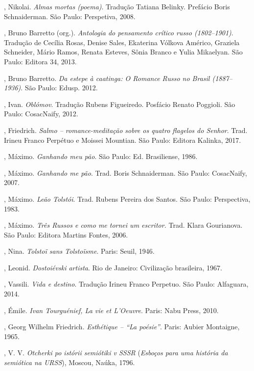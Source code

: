 \begin{Parskip}
, Nikolai. \emph{Almas mortas (poema)}. Tradução Tatiana Belinky. Prefácio Boris Schnaiderman. São Paulo: Perspetiva, 2008.

, Bruno Barretto (org.). \emph{Antologia do pensamento crítico russo (1802--1901)}. Tradução de Cecília Rosas, Denise Sales, Ekaterina Vólkova Américo, Graziela Schneider, Mário Ramos, Renata Esteves, Sônia Branco e Yulia Mikaelyan. São Paulo: Editora 34, 2013.

, Bruno Barretto. \emph{Da estepe à caatinga: O Romance Russo no Brasil (1887--1936)}. São Paulo:  Edusp. 2012.

, Ivan. \emph{Oblómov}. Tradução Rubens Figueiredo. Posfácio Renato Poggioli.
São Paulo: CosacNaify, 2012.

, Friedrich. \emph{Salmo -- romance-meditação sobre os quatro flagelos do Senhor}. Trad. Irineu Franco Perpétuo e Moissei Mountian. São Paulo: Editora Kalinka, 2017.

, Máximo. \emph{Ganhando meu pão}. São Paulo: Ed. Brasiliense, 1986.

, Máximo. \emph{Ganhando me pão}. Trad. Boris Schnaiderman. São Paulo: CosacNaify, 2007.

, Máximo. \emph{Leão Tolstói}. Trad. Rubens Pereira dos Santos. São Paulo: Perspectiva, 1983.

, Máximo. \emph{Três Russos e como me tornei um escritor.} Trad. Klara Gourianova. São Paulo: Editora Martins Fontes, 2006.

, Nina. \emph{Tolstoï sans Tolstoïsme}. Paris: Seuil, 1946.

, Leonid. \emph{Dostoiévski artista}. Rio de Janeiro: Civilização brasileira, 1967.

, Vassili. \emph{Vida e destino}. Tradução Irineu Franco Perpetuo. São Paulo: Alfaguara, 2014.

, Émile. \emph{Ivan Tourguénief, La vie et L'Oeuvre}. Paris: Nabu
Press, 2010.

, Georg Wilhelm Friedrich. \emph{Esthétique -- ``La
poésie''}. Paris: Aubier Montaigne, 1965.

, V. V. \emph{Otcherki po istórii semiótiki v SSSR} (\emph{Esboços
para uma história da semiótica na URSS}), Moscou, Naúka, 1796.


\end{Parskip}
